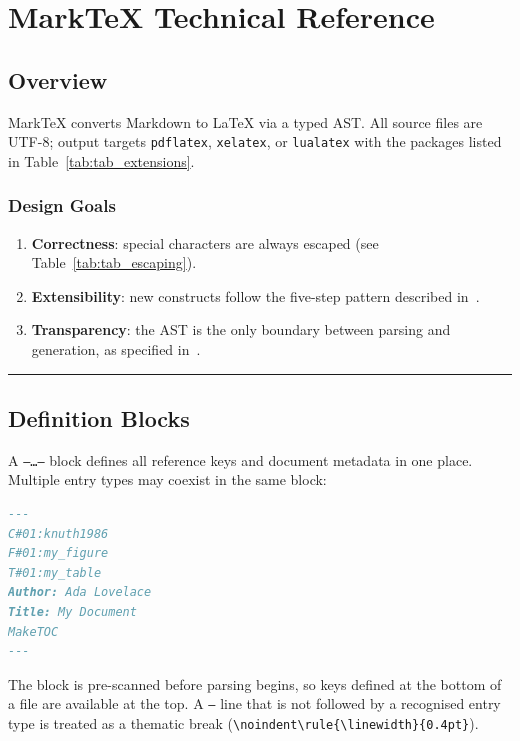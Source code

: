 \documentclass{article}
\begin{document}
\section{MarkTeX Technical Reference}

\subsection{Overview}

MarkTeX converts Markdown to LaTeX via a typed AST. All source files are UTF-8; output targets \texttt{pdflatex}, \texttt{xelatex}, or \texttt{lualatex} with the packages listed in Table~\ref{tab:tab_extensions}.

\subsubsection{Design Goals}

\begin{enumerate}
  \item \textbf{Correctness}: special characters are always escaped (see Table~\ref{tab:tab_escaping}).
  \item \textbf{Extensibility}: new constructs follow the five-step pattern described in~\cite{knuth1986}.
  \item \textbf{Transparency}: the AST is the only boundary between parsing and generation, as specified in~\cite{latex2023guide}.
\end{enumerate}


\noindent\rule{\linewidth}{0.4pt}

\subsection{Definition Blocks}

A \texttt{---…---} block defines all reference keys and document metadata in one place. Multiple entry types may coexist in the same block:

\begin{lstlisting}[language=markdown]
---
C#01:knuth1986
F#01:my_figure
T#01:my_table
Author: Ada Lovelace
Title: My Document
MakeTOC
---
\end{lstlisting}

The block is pre-scanned before parsing begins, so keys defined at the bottom of a file are available at the top. A \texttt{---} line that is not followed by a recognised entry type is treated as a thematic break (\texttt{\textbackslash{}noindent\textbackslash{}rule\{\textbackslash{}linewidth\}\{0.4pt\}}).
\end{document}
